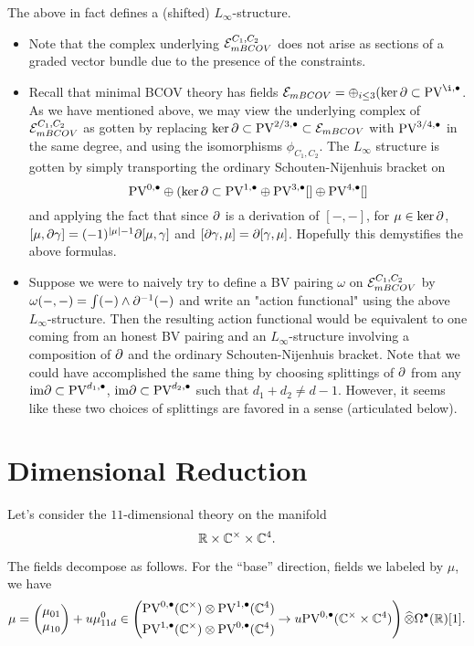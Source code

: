 \documentclass[11pt]{article}
\def\Hat{\widehat}
\begin{document}
\begin{prop}
The above in fact defines a (shifted) $L_\infty$-structure.
\end{prop}

\begin{rmk}
\begin{itemize}
\item Note that the complex underlying $\mathcal{E}_{mBCOV}^{C_1,C_2}$ does not arise as sections of a graded vector bundle due to the presence of the constraints.
\item Recall that minimal BCOV theory has fields $\mc E_{mBCOV}=\oplus_{i\leq 3} (\ker\del\subset\PV^{\i,\bullet}$. As we have mentioned above, we may view the underlying complex of $\mathcal{E}_{mBCOV}^{C_1,C_2}$ as gotten by replacing $\ker\partial\subset\text{PV}^{2/3,\bullet}\subset\mathcal{E}_{mBCOV}$ with $\text{PV}^{3/4,\bullet}$ in the same degree, and using the isomorphisms $\phi_{C_1,C_2}$. The $L_\infty$ structure is gotten by simply transporting the ordinary Schouten-Nijenhuis bracket on \[\text{PV}^{0,\bullet}\oplus(\ker\partial\subset\text{PV}^{1,\bullet}\oplus\text{PV}^{3,\bullet}[]\oplus\text{PV}^{4,\bullet}[]\] and applying the fact that since $\partial$ is a derivation of $[-,-]$, for $\mu\in\ker\partial$, $[\mu,\partial\gamma]=(-1)^{|\mu|-1}\partial[\mu,\gamma]$ and $[\partial\gamma,\mu]=\partial[\gamma,\mu]$. Hopefully this demystifies the above formulas.
\item Suppose we were to naively try to define a BV pairing $\omega$ on $\mathcal{E}_{mBCOV}^{C_1,C_2}$ by $\omega(-,-)=\int (-)\wedge\partial^{-1}(-)$ and write an "action functional" using the above $L_\infty$-structure. Then the resulting action functional would be equivalent to one coming from an honest BV pairing and an $L_\infty$-structure involving a composition of $\partial$ and the ordinary Schouten-Nijenhuis bracket. Note that we could have accomplished the same thing by choosing splittings of $\partial$ from any $\text{im}\partial\subset \text{PV}^{d_1,\bullet}$, $\text{im}\partial\subset\text{PV}^{d_2,\bullet}$ such that $d_1+d_2\neq d-1$. However, it seems like these two choices of splittings are favored in a sense (articulated below). 
\end{itemize}
\end{rmk}
\fi

\section{Dimensional Reduction}
Let's consider the $11$-dimensional theory on the manifold
\[
\mathbb{R}\times\mathbb{C}^\times\times\mathbb{C}^4 .
\]

The fields decompose as follows.
For the ``base'' direction, fields we labeled by $\mu$, we have
\[
\mu = \begin{pmatrix} \mu_{01} \\ \mu_{10} \end{pmatrix} + u \mu_{11d}^0 \in \left (\begin{aligned} & \PV^{0,\bullet}(\C^\times)\otimes\PV^{1,\bullet}(\C^4) \\ & \PV^{1,\bullet}(\C^\times)\otimes\PV^{0,\bullet}(\C^4)\end{aligned} \to u \PV^{0,\bullet}(\C^\times\times\C^4)\right ) \Hat{\otimes} \Omega^\bullet(\R) [1] .
\]
\end{document}
